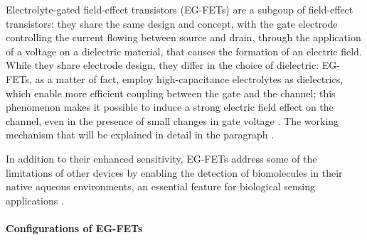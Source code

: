 Electrolyte-gated field-effect transistors (EG-FETs) are a subgoup of field-effect transistors: they share the same design and concept, with the gate electrode controlling the current flowing between source and drain, through the application of a voltage on a dielectric material, that causes the formation of an electric field. While they share electrode design, they differ in the choice of dielectric: EG-FETs, as a matter of fact, employ high-capacitance electrolytes as dielectrics, which enable more efficient coupling between the gate and the channel; this phenomenon makes it possible to induce a strong electric field effect on the channel, even in the presence of small changes in gate voltage \citet{kimElectrolyteGated2013, wangElectrolytic2016}. The working mechanism that will be explained in detail in the paragraph .

In addition to their enhanced sensitivity, EG-FETs address some of the limitations of other devices by enabling the detection of biomolecules in their native aqueous environments, an essential feature for biological sensing applications \citep{wangElectrolytic2016}.

\paragraph{Configurations of EG-FETs}

